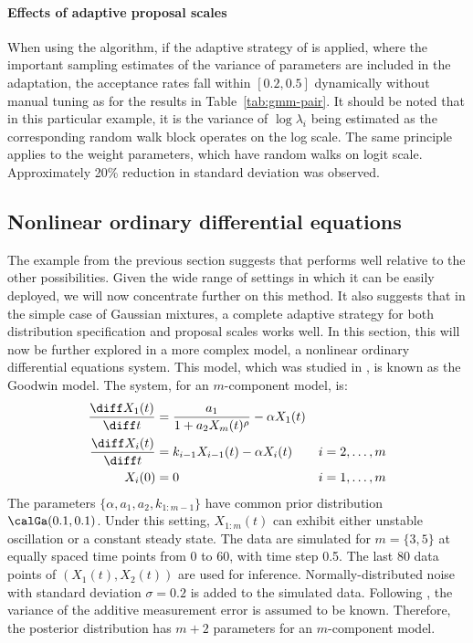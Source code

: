 \paragraph{Effects of adaptive proposal scales} When using the \smc[2]
algorithm, if the adaptive strategy of \cite{Andrieu:2006tw} is applied,
where the important sampling estimates of the variance of parameters are
included in the adaptation, the acceptance rates fall within $[0.2, 0.5]$
dynamically without manual tuning as for the results in
Table~\ref{tab:gmm-pair}. It should be noted that in this particular example,
it is the variance of $\log\lambda_i$ being estimated as the corresponding
random walk block operates on the log scale. The same principle applies to
the weight parameters, which have random walks on logit scale.
Approximately 20\% reduction in standard deviation was observed.


\subsection{Nonlinear ordinary differential equations}
\label{sub:Nonlinear ordinary differential equations}

The example from the previous section suggests that \smc[2] performs well
relative to the other \smc possibilities. Given the wide range of settings
in which it can be easily deployed, we will now concentrate
further on this method. It also suggests that in the simple case of Gaussian
mixtures, a complete adaptive strategy for both distribution specification
and proposal scales works well. In this section, this will now be further
explored in a more complex model, a nonlinear ordinary differential equations
system. This model, which was studied in \cite{Calderhead:2009bd}, is known
as the Goodwin model. The \ode system, for an $m$-component model, is:
\begin{align*}
  \frac{\diff X_1(t)}{\diff t} &= \frac{a_1}{1 + a_2 X_m(t)^{\rho}}
  - \alpha X_1(t)  & \\
  \frac{\diff X_i(t)}{\diff t} &= k_{i-1}X_{i-1}(t) - \alpha X_i(t)
  & i = 2,\dots,m \\
  X_i(0) &= 0 & i = 1,\dots,m
\end{align*}
The parameters $\{\alpha,a_1,a_2,k_{1:m-1}\}$ have common prior distribution
$\calGa(0.1, 0.1)$. Under this setting, $X_{1:m}(t)$ can exhibit either
unstable oscillation or a constant steady state. The data are simulated for
$m=\{3,5\}$ at equally spaced time points from 0 to 60, with time step 0.5.
The last 80 data points of $(X_1(t), X_2(t))$ are used for inference.
Normally-distributed noise with standard  deviation $\sigma=0.2$ is added to
the simulated data. Following \cite{Calderhead:2009bd}, the variance of the
additive measurement error is assumed to be known. Therefore, the posterior
distribution has $m+2$ parameters for an $m$-component model.

